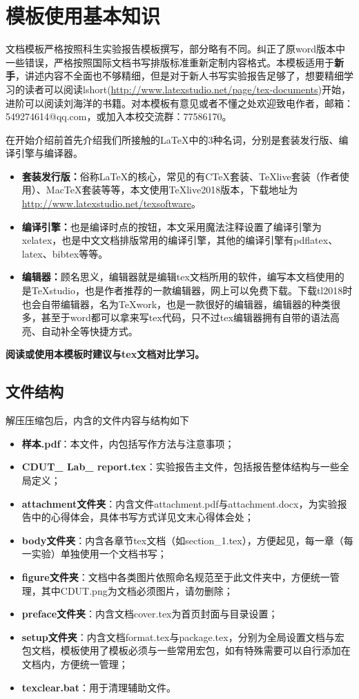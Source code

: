 \chapter{模板使用基本知识}
文档模板严格按照科生实验报告模板撰写，部分略有不同。纠正了原word版本中一些错误，严格按照国际文档书写排版标准重新定制内容格式。本模板适用于\textbf{新手}，讲述内容不全面也不够精细，但是对于新人书写实验报告足够了，想要精细学习的读者可以阅读lshort(\url{http://www.latexstudio.net/page/tex-documents})开始，进阶可以阅读刘海洋的书籍。对本模板有意见或者不懂之处欢迎致电作者，邮箱：549274614@qq.com，或加入本校交流群：77586170。

在开始介绍前首先介绍我们所接触的\LaTeX 中的3种名词，分别是套装发行版、编译引擎与编译器。
\begin{itemize}
\item \textbf{套装发行版：}俗称\LaTeX 的核心，常见的有CTeX套装、TeXlive套装（作者使用）、MacTeX套装等等，本文使用TeXlive2018版本，下载地址为\url{http://www.latexstudio.net/texsoftware}。

\item \textbf{编译引擎：}也是编译时点的按钮，本文采用魔法注释设置了编译引擎为xelatex，也是中文文档排版常用的编译引擎，其他的编译引擎有pdflatex、latex、bibtex等等。
 
\item \textbf{编辑器：}顾名思义，编辑器就是编辑tex文档所用的软件，编写本文档使用的是TeXstudio，也是作者推荐的一款编辑器，网上可以免费下载。下载tl2018时也会自带编辑器，名为TeXwork，也是一款很好的编辑器，编辑器的种类很多，甚至于word都可以拿来写tex代码，只不过tex编辑器拥有自带的语法高亮、自动补全等快捷方式。
\end{itemize}

\textbf{阅读或使用本模板时建议与tex文档对比学习。}

\section{文件结构}
解压压缩包后，内含的文件内容与结构如下
\begin{itemize}
\item \textbf{样本.pdf}：本文件，内包括写作方法与注意事项；
\item \textbf{CDUT\_ Lab\_ report.tex}：实验报告主文件，包括报告整体结构与一些全局定义；
\item \textbf{attachment文件夹}：内含文件attachment.pdf与attachment.docx，为实验报告中的心得体会，具体书写方式详见文末心得体会处；
\item \textbf{body文件夹}：内含各章节tex文档（如section\_1.tex），方便起见，每一章（每一实验）单独使用一个文档书写；
\item \textbf{figure文件夹}：文档中各类图片依照命名规范至于此文件夹中，方便统一管理，其中CDUT.png为文档必须图片，请勿删除；
\item \textbf{preface文件夹}：内含文档cover.tex为首页封面与目录设置；
\item \textbf{setup文件夹}：内含文档format.tex与package.tex，分别为全局设置文档与宏包文档，模板使用了模板必须与一些常用宏包，如有特殊需要可以自行添加在文档内，方便统一管理；
\item \textbf{texclear.bat}：用于清理辅助文件。
\end{itemize}

